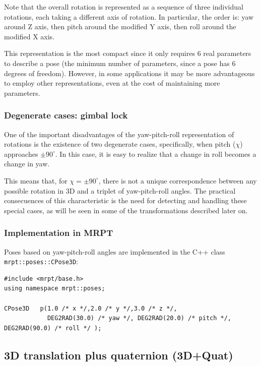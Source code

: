 \documentclass[a4paper,10pt]{report}
\begin{document}
Note that the overall rotation is represented as a sequence of three individual rotations, 
each taking a different axis of rotation. 
In particular, the order is: yaw around Z axis, then pitch around the modified Y axis, 
then roll around the modified X axis.

This representation is the most compact since it only requires 6 real parameters
to describe a pose (the minimum number of parameters, since a pose has 6 degrees of freedom).
However, in some applications it may be more advantageous to employ other representations, 
even at the cost of maintaining more parameters.


\subsubsection{Degenerate cases: gimbal lock}
\label{sect:ypr:gimbal}

One of the important disadvantages of the yaw-pitch-roll representation of rotations is the existence 
of two degenerate cases, specifically, when pitch ($\chi$) approaches $\pm 90^\circ$. In this case, 
it is easy to realize that a change in roll becomes a change in yaw.

This means that, for $ \chi = \pm 90^\circ$, there is not a unique correspondence between any possible
rotation in 3D and a triplet of yaw-pitch-roll angles. 
The practical consecuences of this characteristic is the need for detecting and handling these 
special cases, as will be seen in some of the transformations described later on.


\subsubsection{Implementation in MRPT}

Poses based on yaw-pitch-roll angles are implemented in the C++ class \texttt{mrpt::poses::CPose3D}:

\begin{lstlisting}
#include <mrpt/base.h> 
using namespace mrpt::poses; 

CPose3D   p(1.0 /* x */,2.0 /* y */,3.0 /* z */, 
            DEG2RAD(30.0) /* yaw */, DEG2RAD(20.0) /* pitch */, DEG2RAD(90.0) /* roll */ );
\end{lstlisting}


\newpage

\subsection{3D translation plus quaternion (3D+Quat)}
\end{document}
